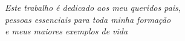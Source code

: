\begin{dedicatoria}
   \vspace*{\fill}
   \centering
   \noindent
   \textit{ Este trabalho é dedicado aos meu queridos pais,\\
   pessoas essenciais para toda minha formação\\
   e meus maiores exemplos de vida} \vspace*{\fill}
\end{dedicatoria}
